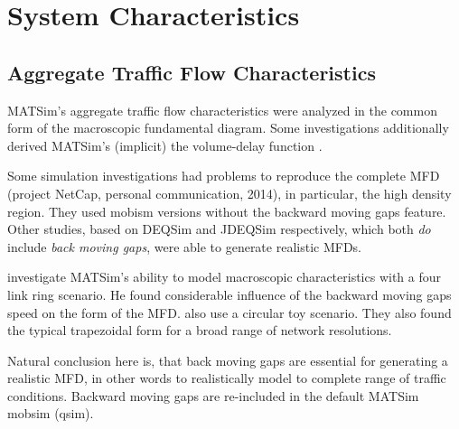 \section{System Characteristics}
\subsection{Aggregate Traffic Flow Characteristics}
MATSim's aggregate traffic flow characteristics were analyzed in the common form of the macroscopic fundamental diagram. Some investigations additionally derived MATSim's (implicit) the volume-delay function \citep[][]{HorniMontini_STRC_2013}.

Some simulation investigations had problems to reproduce the complete MFD (project NetCap, personal communication, 2014), in particular, the high density region. They used mobism versions without the backward moving gaps feature. Other studies, based on DEQSim and JDEQSim respectively, which both \emph{do} include \emph{back moving gaps}, were able to generate realistic MFDs. 

\citet[p.81ff][]{Simoni_MastersThesis_2013} investigate MATSim's ability to model macroscopic characteristics with a four link ring scenario. He found considerable influence of the backward moving gaps speed on the form of the MFD. \citet[][]{CharyparEtAl_TRB_2009} also use a circular toy scenario. They also found the typical trapezoidal form for a broad range of network resolutions.

Natural conclusion here is, that back moving gaps are essential for generating a realistic MFD, in other words to realistically model to complete range of traffic conditions. Backward moving gaps are re-included in the default MATSim mobsim (qsim). 


